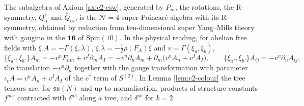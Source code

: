 \begin{remark}
The subalgebra of Axiom \ref{ax:c2-esw}, generated by $P_m$, the rotations, the R-symmetry, $Q^i_\alpha$ and $\bar Q_{\dot\alpha i}$, is the $\mathcal N=4$ super-Poincaré algebra with its R-symmetry, obtained by reduction from ten-dimensional super Yang--Mills theory with gaugino in the $\mathbf{16}$ of $\mathrm{Spin}(10)$. In the physical reading, for abelian free fields with $\xi.A=-\Gamma(\xi,\lambda)$, $\xi.\lambda=-\tfrac12\rho(F_A)\xi$ and $v=\Gamma(\xi_a,\xi_b)$,
\[
\{\xi_a.,\xi_b.\}A_m=-v^nF_{nm}+v^I\partial_mA_I=-v^n\partial_nA_m+\partial_m\big(v^nA_n+v^IA_I\big),\qquad \{\xi_a.,\xi_b.\}A_{ij}=-v^n\partial_nA_{ij},
\]
the translation $-v^n\partial_n$ together with the gauge transformation with parameter $\iota_vA=v^nA_n+v^IA_I$ of the $c^*$ term of $S^{(2)}$. In Lemma \ref{lem:c2-colour} the tree tensors are, for $\mathfrak{su}(N)$ and up to normalisation, products of structure constants $f^{abc}$ contracted with $\delta^{ab}$ along a tree, and $\delta^{ab}$ for $k=2$.
\end{remark}
